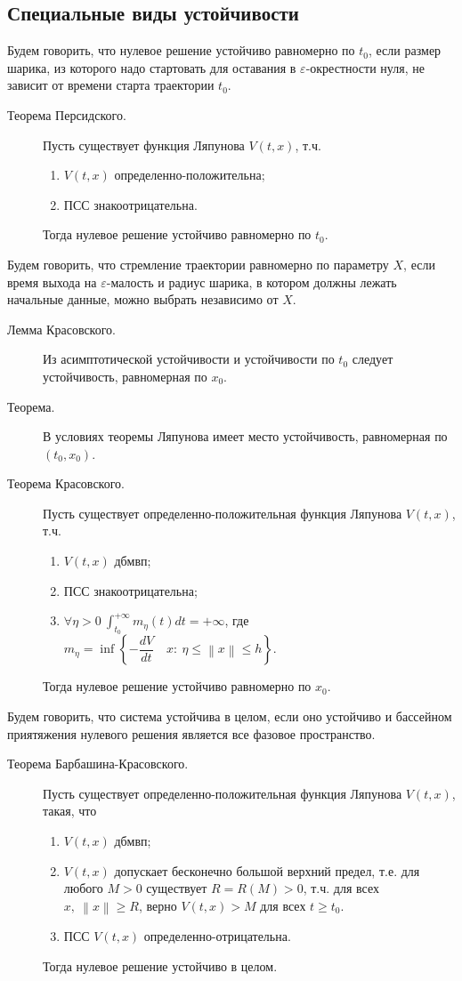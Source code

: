 \documentclass[a4paper,12pt]{scrartcl}
\DeclareMathOperator{\stick}{\biggl|}
\newcommand{\norm}[1]{\left\lVert #1 \right\rVert}
\begin{document}
\subsection{Специальные виды устойчивости}
Будем говорить, что нулевое решение устойчиво равномерно по $t_0$, если размер шарика, из которого надо стартовать для оставания в $\varepsilon$-окрестности нуля, не зависит от времени старта траектории $t_0$.
\begin{description}
 \item[Теорема Персидского.] Пусть существует функция Ляпунова $V(t,x)$, т.ч.
\begin{enumerate}
 \item  $V(t,x)$ определенно-положительна; 
 \item  ПСС знакоотрицательна.
\end{enumerate}
Тогда нулевое решение устойчиво равномерно по $t_0$.
\end{description}

Будем говорить, что стремление траектории равномерно по параметру $X$, если время выхода на $\varepsilon$-малость и радиус шарика, в котором должны лежать начальные данные, можно выбрать независимо от $X$.
\begin{description}
 \item[Лемма Красовского.] Из асимптотической устойчивости и устойчивости по $t_0$ следует устойчивость, равномерная по $x_0$.
 \item[Теорема.] В условиях теоремы Ляпунова имеет место устойчивость, равномерная по $(t_0,x_0)$.
 \item[Теорема Красовского.] Пусть существует определенно-положительная функция Ляпунова $V(t,x)$, т.ч.
\begin{enumerate}
 \item $V(t,x)$ дбмвп; 
 \item ПСС знакоотрицательна;
 \item $\forall \eta>0 \ \int_{t_0}^{+\infty}m_\eta(t)dt = + \infty$, где $m_\eta = \inf\left\lbrace -\dfrac{dV}{dt} \ \stick\ x: \ \eta \leqslant \norm{x} \leqslant h\right\rbrace$. 
\end{enumerate}
Тогда нулевое решение устойчиво равномерно по $x_0$.
\end{description}
 
Будем говорить, что система устойчива в целом, если оно устойчиво и бассейном приятяжения нулевого решения является все фазовое пространство.
\begin{description}
 \item[Теорема Барбашина-Красовского.] Пусть существует определенно-положительная функция Ляпунова $V(t,x)$, такая, что
\begin{enumerate}
 \item $V(t,x)$ дбмвп; 
 \item $V(t,x)$ допускает бесконечно большой верхний предел, т.е. для любого $M>0$ существует $R=R(M)>0$, т.ч. для всех $x,\ \norm{x} \geqslant R$, верно $V(t,x) > M$ для всех $t\geqslant t_0$.
 \item ПСС $V(t,x)$ определенно-отрицательна.
\end{enumerate}
Тогда нулевое решение устойчиво в целом.
\end{description}
\end{document}
